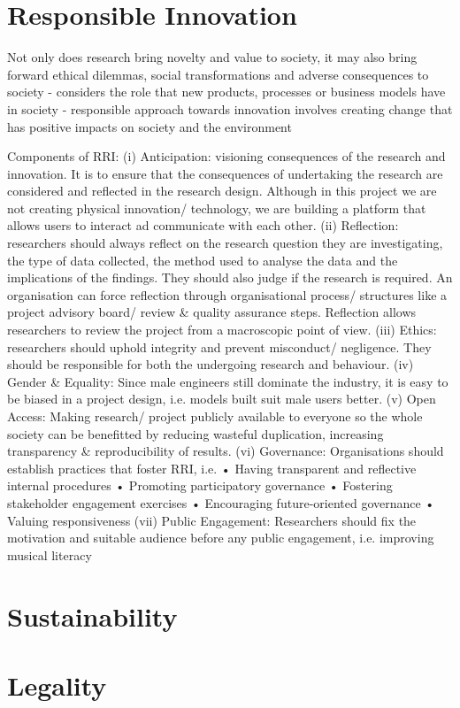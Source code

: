 \section{Responsible Innovation}
Not only does research bring novelty and value to society, it may also bring forward ethical dilemmas, social transformations and adverse consequences to society
-	considers the role that new products, processes or business models have in society 
-	responsible approach towards innovation involves creating change that has positive impacts on society and the environment

Components of RRI:
(i)	Anticipation: visioning consequences of the research and innovation. It is to ensure that the consequences of undertaking the research are considered and reflected in the research design. Although in this project we are not creating physical innovation/ technology, we are building a platform that allows users to interact ad communicate with each other.
(ii)	Reflection: researchers should always reflect on the research question they are investigating, the type of data collected, the method used to analyse the data and the implications of the findings. They should also judge if the research is required. An organisation can force reflection through organisational process/ structures like a project advisory board/ review & quality assurance steps. Reflection allows researchers to review the project from a macroscopic point of view.
(iii)	Ethics: researchers should uphold integrity and prevent misconduct/ negligence. They should be responsible for both the undergoing research and behaviour.
(iv)	Gender & Equality: Since male engineers still dominate the industry, it is easy to be biased in a project design, i.e. models built suit male users better.
(v)	Open Access: Making research/ project publicly available to everyone so the whole society can be benefitted by reducing wasteful duplication, increasing transparency & reproducibility of results.
(vi)	Governance: Organisations should establish practices that foster RRI, i.e. 
•	Having transparent and reflective internal procedures
•	Promoting participatory governance
•	Fostering stakeholder engagement exercises
•	Encouraging future-oriented governance
•	Valuing responsiveness
(vii)	Public Engagement: Researchers should fix the motivation and suitable audience before any public engagement, i.e. improving musical literacy

\section{Sustainability}


\section{Legality}
